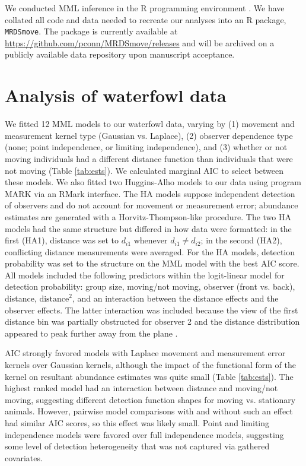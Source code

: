 \documentclass[12pt,fleqn]{article}
\begin{document}
We conducted MML inference in the R programming environment \citep{RTeam2016}.  We have collated all code and data needed to recreate our analyses into an R package, \texttt{MRDSmove}. The package is currently available at \url{https://github.com/pconn/MRDSmove/releases} and will be archived on a publicly available data repository upon manuscript acceptance.

\section{Analysis of waterfowl data} \label{sec:data}

We fitted 12 MML models to our waterfowl data, varying by (1) movement and measurement kernel type (Gaussian vs. Laplace), (2) observer dependence type (none; point independence, or limiting independence), and (3) whether or not moving individuals had a different distance function than individuals that were not moving (Table \ref{tab:ests}).  We calculated marginal AIC to select between these models.  We also fitted two Huggins-Alho
\citep[HA;][]{Huggins1989,Alho1990} models to our data using program MARK \citep{WhiteBurnham1999} via an RMark \citep{Laake2013} interface. The HA models suppose independent detection of observers and do not account for movement or measurement error; abundance estimates are generated with a Horvitz-Thompson-like procedure. The two HA models had the same structure but differed in how data were formatted: in the first (HA1), distance was set to $d_{i1}$ whenever $d_{i1}\ne d_{i2}$; in the second (HA2), conflicting distance measurements were averaged.
For the HA models, detection probability was set to the structure on the MML model with the best AIC score.
All models included the following predictors within the logit-linear model for detection probability: group size, moving/not moving, observer (front vs. back), distance, $\text{distance}^2$, and an interaction between the distance effects and the observer effects.  The latter interaction was included because the view of the first distance bin was partially obstructed for observer 2 and the distance distribution appeared to peak further away from the plane \citep[see][]{AlisauskasConn2017}.

AIC strongly favored models with Laplace movement and measurement error kernels over Gaussian kernels, although the impact of the functional form of the kernel on resultant abundance estimates was quite small (Table \ref{tab:ests}).  The highest ranked model had an interaction between distance and moving/not moving, suggesting different detection function shapes for moving vs. stationary animals. However, pairwise model comparisons with and without such an effect had similar AIC scores, so this effect was likely small. Point and limiting independence models were favored over full independence models, suggesting some level of detection heterogeneity that was not captured via gathered covariates.
\end{document}
